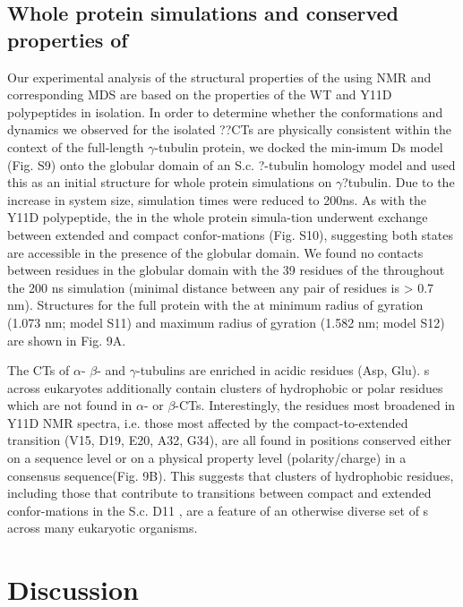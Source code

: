 \subsection{Whole protein simulations and conserved properties of \gct{}}

Our experimental analysis of the structural properties of the \gct{} using NMR and corresponding MDS are based on the properties of the WT and Y11D \gct{} polypeptides in isolation. In order to determine whether the conformations and dynamics we observed for the isolated ??CTs are physically consistent within the context of the full-length $\gamma$-tubulin protein, we docked the min-imum Ds \gct{} model (Fig. S9) onto the globular domain of an S.c. ?-tubulin homology model and used this as an initial structure for whole protein simulations on $\gamma$?tubulin. Due to the increase in system size, simulation times were reduced to 200ns.  As with the Y11D \gct{} polypeptide, the \gct{} in the whole protein simula-tion underwent exchange between extended and compact confor-mations (Fig. S10), suggesting both states are accessible in the presence of the globular domain. We found no contacts between residues in the globular domain with the 39 residues of the \gct{} throughout the 200 ns simulation (minimal distance between any pair of residues is > 0.7 nm). Structures for the full protein with the \gct{} at minimum radius of gyration (1.073 nm; model S11) and maximum radius of gyration (1.582 nm; model S12) are shown in Fig. 9A.


The CTs of $\alpha$- $\beta$- and $\gamma$-tubulins are enriched in acidic residues (Asp, Glu). \gct{} s across eukaryotes additionally contain clusters of hydrophobic or polar residues which are not found in $\alpha$- or $\beta$-CTs. Interestingly, the residues most broadened in Y11D NMR spectra, i.e. those most affected by the compact-to-extended transition (V15, D19, E20, A32, G34), are all found in positions conserved either on a sequence level or on a physical property level (polarity/charge) in a consensus \gct{} sequence(Fig. 9B). This suggests that clusters of hydrophobic residues, including those that contribute to transitions between compact and extended confor-mations in the S.c. D11 \gct{}, are a feature of an otherwise diverse set of \gct{} s across many eukaryotic organisms.


\section{Discussion}

